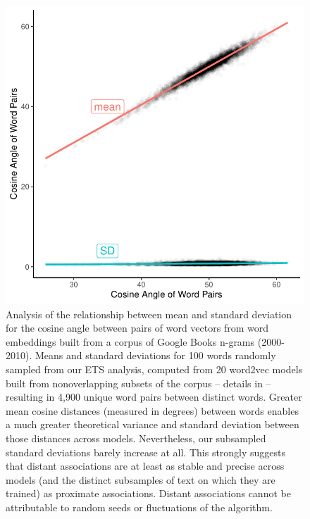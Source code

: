 \documentclass[9pt,twoside,lineno]{pnas-new}
\begin{document}
\pagebreak
 \clearpage

 \begin{figure}[h]
\centering
     \includegraphics{suppfigs/austin_mean_sd_distancs.pdf}
         \caption{Analysis of the relationship between mean and standard deviation for the cosine angle between pairs of word vectors from word embeddings built from a corpus of Google Books n-grams (2000-2010). Means and standard deviations  for 100 words randomly sampled from our ETS analysis, computed from 20 word2vec models built from nonoverlapping subsets of the corpus \cite{politis1999subsampling} -- details in \cite{kozlowski2019geometry} -- resulting in 4,900 unique word pairs between distinct words. Greater mean cosine distances (measured in degrees) between words enables a much greater theoretical variance and standard deviation between those distances across models. Nevertheless, our subsampled standard deviations barely increase at all. This strongly suggests that distant associations are at least as stable and precise across models (and the distinct subsamples of text on which they are trained) as proximate associations. Distant associations cannot be attributable to random seeds or fluctuations of the algorithm.
}
\end{figure}
\end{document}
